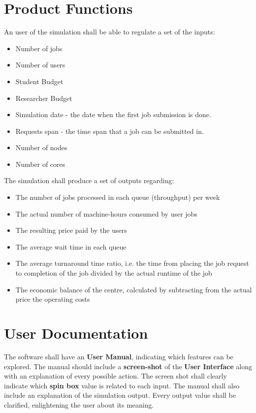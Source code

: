\documentclass{scrreprt}
\begin{document}
\section{Product Functions}
An user of the simulation shall be able to regulate a set of the inputs:

\begin{itemize}
\item Number of jobs \footnotemark
\item Number of users \footnotemark[\value{footnote}]
\item Student Budget \footnotemark[\value{footnote}]
\item Researcher Budget \footnotemark[\value{footnote}]
\item Simulation date - the date when the first job submission is done.
\item Requests span - the time span that a job can be submitted in.
\item Number of nodes
\item Number of cores
\end{itemize}

The simulation shall produce a set of outputs regarding:

\begin{itemize}
\item The number of jobs processed in each queue (throughput) per week
\item The actual number of machine-hours consumed by user jobs
\item The resulting price paid by the users
\item The average wait time in each queue
\item The average turnaround time ratio, i.e. the time from placing the job request to completion of the job divided by the actual runtime of the job
\item The economic balance of the centre, calculated by subtracting from the actual price the operating costs
\end{itemize}



\section{User Documentation}

\par The software shall have an \textbf{User Manual}, indicating which features can be explored. The manual should include a \textbf{screen-shot} of the \textbf{User Interface} along with an explanation of every possible action. The screen shot shall clearly indicate which \textbf{spin box} value is related to each input. The manual shall also include an explanation of the simulation output. Every output value shall be clarified, enlightening the user about its meaning.
\end{document}
